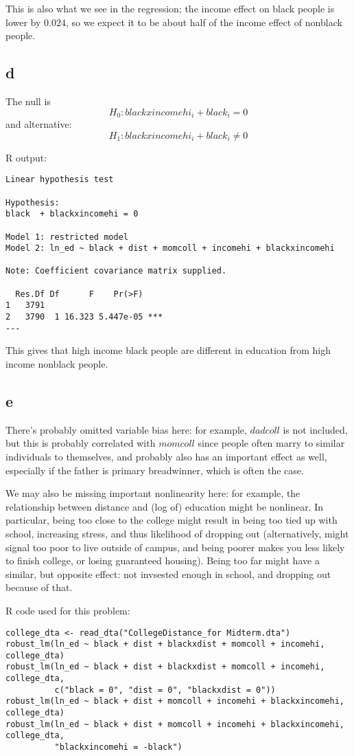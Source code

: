 \documentclass[12pt,letterpaper]{article}
\theoremstyle{definition}
\begin{document}
This is also what we see in the regression; the income effect on black people is lower by $0.024$, so we expect it to be about half of the income effect of nonblack people.

\subsection*{d}

The null is
\[
  H_{0}: blackxincomehi_{i} + black_{i} = 0
\]
and alternative:
\[
  H_{1}: blackxincomehi_{i} + black_{i} \neq 0
\]

R output:
\begin{Verbatim}[fontsize=\small]
Linear hypothesis test

Hypothesis:
black  + blackxincomehi = 0

Model 1: restricted model
Model 2: ln_ed ~ black + dist + momcoll + incomehi + blackxincomehi

Note: Coefficient covariance matrix supplied.

  Res.Df Df      F    Pr(>F)
1   3791
2   3790  1 16.323 5.447e-05 ***
---
\end{Verbatim}

This gives that high income black people are different in education from high income nonblack people.

\subsection*{e}

There's probably omitted variable bias here: for example, $dadcoll$ is not included, but this is probably correlated with $momcoll$ since people often marry to similar individuals to themselves, and probably also has an important effect as well, especially if the father is primary breadwinner, which is often the case.

We may also be missing important nonlinearity here: for example, the relationship between distance and (log of) education might be nonlinear. In particular, being too close to the college might result in being too tied up with school, increasing stress, and thus likelihood of dropping out (alternatively, might signal too poor to live outside of campus, and being poorer makes you less likely to finish college, or losing guaranteed housing). Being too far might have a similar, but opposite effect: not invsested enough in school, and dropping out because of that.

R code used for this problem:
\begin{Verbatim}[fontsize=\small]
college_dta <- read_dta("CollegeDistance_for Midterm.dta")
robust_lm(ln_ed ~ black + dist + blackxdist + momcoll + incomehi, college_dta)
robust_lm(ln_ed ~ black + dist + blackxdist + momcoll + incomehi, college_dta,
          c("black = 0", "dist = 0", "blackxdist = 0"))
robust_lm(ln_ed ~ black + dist + momcoll + incomehi + blackxincomehi, college_dta)
robust_lm(ln_ed ~ black + dist + momcoll + incomehi + blackxincomehi, college_dta,
          "blackxincomehi = -black")
\end{Verbatim}
\end{document}
